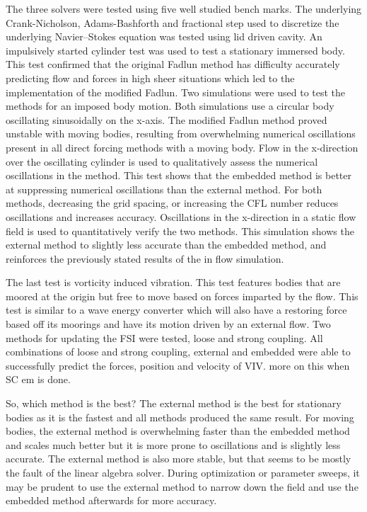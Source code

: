 The three solvers were tested using five well studied bench marks. 
The underlying Crank-Nicholson, Adams-Bashforth and fractional step used to discretize the underlying Navier--Stokes equation was tested using lid driven cavity. 
An impulsively started cylinder test was used to test a stationary immersed body. 
This test confirmed that the original Fadlun method has difficulty accurately predicting flow and forces in high sheer situations which led to the implementation of the modified Fadlun. 
Two simulations were used to test the methods for an imposed body motion. 
Both simulations use a circular body oscillating sinusoidally on the x-axis. 
The modified Fadlun method proved unstable with moving bodies, resulting from overwhelming numerical oscillations present in all direct forcing methods with a moving body. 
Flow in the x-direction over the oscillating cylinder is used to qualitatively assess the numerical oscillations in the method. 
This test shows that the embedded method is better at suppressing numerical oscillations than the external method. 
For both methods, decreasing the grid spacing, or increasing the CFL number reduces oscillations and increases accuracy. 
Oscillations in the x-direction in a static flow field is used to quantitatively verify the two methods. 
This simulation shows the external method to slightly less accurate than the embedded method, and reinforces the previously stated results of the in flow simulation. 

The last test is vorticity induced vibration. 
This test features bodies that are moored at the origin but free to move based on forces imparted by the flow. 
This test is similar to a wave energy converter which will also have a restoring force based off its moorings and have its motion driven by an external flow. 
Two methods for updating the FSI were tested, loose and strong coupling. 
All combinations of loose and strong coupling, external and embedded were able to successfully predict the forces, position and velocity of VIV. 
more on this when SC em is done. 

So, which method is the best? 
The external method is the best for stationary bodies as it is the fastest and all methods produced the same result. 
For moving bodies, the external method is overwhelming faster than the embedded method and scales much better but it is more prone to oscillations and is slightly less accurate. 
The external method is also more stable, but that seems to be mostly the fault of the linear algebra solver.
During optimization or parameter sweeps, it may be prudent to use the external method to narrow down the field and use the embedded method afterwards for more accuracy. 

